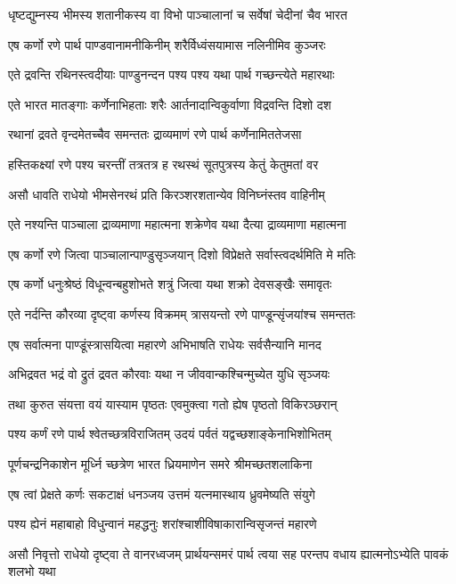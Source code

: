 \twolineshloka
{धृष्टद्युम्नस्य भीमस्य शतानीकस्य वा विभो}
{पाञ्चालानां च सर्वेषां चेदीनां चैव भारत}


\twolineshloka
{एष कर्णो रणे पार्थ पाण्डवानामनीकिनीम्}
{शरैर्विध्वंसयामास नलिनीमिव कुञ्जरः}


\twolineshloka
{एते द्रवन्ति रथिनस्त्वदीयाः पाण्डुनन्दन}
{पश्य पश्य यथा पार्थ गच्छन्त्येते महारथाः}


\twolineshloka
{एते भारत मातङ्गाः कर्णेनाभिहताः शरैः}
{आर्तनादान्विकुर्वाणा विद्रवन्ति दिशो दश}


\twolineshloka
{रथानां द्रवते वृन्दमेतच्चैव समन्ततः}
{द्राव्यमाणं रणे पार्थ कर्णेनामिततेजसा}


\twolineshloka
{हस्तिकक्ष्यां रणे पश्य चरन्तीं तत्रतत्र ह}
{रथस्थं सूतपुत्रस्य केतुं केतुमतां वर}


\twolineshloka
{असौ धावति राधेयो भीमसेनरथं प्रति}
{किरञ्शरशतान्येव विनिघ्नंस्तव वाहिनीम्}


\twolineshloka
{एते नश्यन्ति पाञ्चाला द्राव्यमाणा महात्मना}
{शक्रेणेव यथा दैत्या द्राव्यमाणा महात्मना}


\twolineshloka
{एष कर्णो रणे जित्वा पाञ्चालान्पाण्डुसृञ्जयान्}
{दिशो विप्रेक्षते सर्वास्त्वदर्थमिति मे मतिः}


\twolineshloka
{एष कर्णो धनुःश्रेष्ठं विधून्वन्बहुशोभते}
{शत्रुं जित्वा यथा शक्रो देवसङ्खैः समावृतः}


\twolineshloka
{एते नर्दन्ति कौरव्या दृष्ट्वा कर्णस्य विक्रमम्}
{त्रासयन्तो रणे पाण्डून्सृंजयांश्च समन्ततः}


\twolineshloka
{एष सर्वात्मना पाण्डूंस्त्रासयित्वा महारणे}
{अभिभाषति राधेयः सर्वसैन्यानि मानद}


\twolineshloka
{अभिद्रवत भद्रं वो द्रुतं द्रवत कौरवाः}
{यथा न जीववान्कश्चिन्मुच्येत युधि सृञ्जयः}


\twolineshloka
{तथा कुरुत संयत्ता वयं यास्याम पृष्ठतः}
{एवमुक्त्वा गतो ह्येष पृष्ठतो विकिरञ्छरान्}


\twolineshloka
{पश्य कर्णं रणे पार्थ श्वेतच्छत्रविराजितम्}
{उदयं पर्वतं यद्वच्छशाङ्केनाभिशोभितम्}


\twolineshloka
{पूर्णचन्द्रनिकाशेन मूर्ध्नि च्छत्रेण भारत}
{ध्रियमाणेन समरे श्रीमच्छतशलाकिना}


\twolineshloka
{एष त्वां प्रेक्षते कर्णः सकटाक्षं धनञ्जय}
{उत्तमं यत्नमास्थाय ध्रुवमेष्यति संयुगे}


\twolineshloka
{पश्य ह्येनं महाबाहो विधुन्वानं महद्धनुः}
{शरांश्चाशीविषाकारान्विसृजन्तं महारणे}


\threelineshloka
{असौ निवृत्तो राधेयो दृष्ट्वा ते वानरध्वजम्}
{प्रार्थयन्समरं पार्थ त्वया सह परन्तप}
{वधाय ह्यात्मनोऽभ्येति पावकं शलभो यथा}


